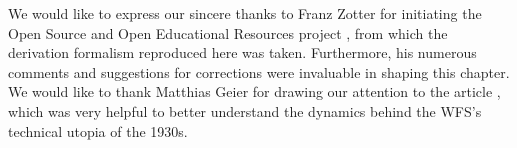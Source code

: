 %
%
%
%
%
%

We would like to express our sincere thanks to Franz Zotter for initiating
the Open Source and Open Educational Resources project \cite{ZotterSchultz2020_White},
from which the derivation formalism reproduced here was taken.
Furthermore, his numerous comments and suggestions for corrections were
invaluable in shaping this chapter.
%
%
We would like to thank Matthias Geier for drawing our attention to the
article \cite{Fletcher1934}, which was very helpful to better
understand the dynamics behind the WFS's technical utopia of the 1930s.